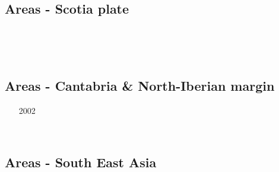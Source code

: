 \subsection{Areas - Scotia plate}

\begin{scriptsize}
\begin{itemize}
\item[\twothousandthirteen]
\textcite{necb13} \\
\item[\twothousandtwenty]
\textcite{vaga20} \\
\item[\twothousandtwentyone]
\textcite{vasv21} 
\end{itemize}
\end{scriptsize}

\subsection{Areas - Cantabria \& North-Iberian margin}

\begin{scriptsize}
\begin{itemize}
\item[2002]
\textcite{clbb02} \\
\item[\twothousandfifteen]
\textcite{peap15} \\
\end{itemize}
\end{scriptsize}

\subsection{Areas - South East Asia}

\begin{scriptsize}
\begin{itemize}
\item[\twothousand]
\textcite{lecd00} \\
\item[\twothousandfour]
\textcite{rekv04} \\
\item[\twothousandfifteen]
\textcite{yotr15} \\
\textcite{hasp15} \\
\textcite{meds15} \\
\item[\twothousandsixteen]
\textcite{necg16} \\
\end{itemize}
\end{scriptsize}


